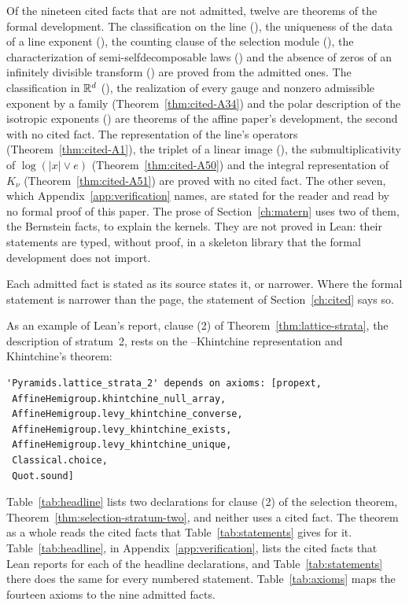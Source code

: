 Of the nineteen cited facts that are not admitted, twelve are theorems of the formal development.
The classification on the line (), the uniqueness of the data of a line exponent
(), the counting clause of the selection module (), the characterization of
semi-selfdecomposable laws () and the absence of zeros of an infinitely divisible
transform () are proved from the admitted ones. The classification in $\mathbb{R}^d$
(), the realization of every gauge and nonzero admissible exponent by a family
(Theorem~\ref{thm:cited-A34}) and the polar description of the isotropic exponents ()
are theorems of
the affine paper's development, the second with no cited fact. The representation of the line's
operators (Theorem~\ref{thm:cited-A1}), the triplet of a linear image (), the
submultiplicativity of $\log(|x| \vee e)$ (Theorem~\ref{thm:cited-A50}) and the integral
representation of $K_\nu$ (Theorem~\ref{thm:cited-A51}) are proved with no cited fact. The other
seven, which
Appendix~\ref{app:verification} names, are stated for the reader and read by no formal proof of
this paper. The prose of Section~\ref{ch:matern} uses two of them, the Bernstein facts, to explain
the kernels. They are not proved in Lean: their statements are typed, without proof, in a skeleton
library that the formal development does not import.

Each admitted fact is stated as its source states it, or narrower. Where the formal statement is
narrower than the page, the statement of Section~\ref{ch:cited} says so.

As an example of Lean's report, clause (2) of Theorem~\ref{thm:lattice-strata}, the description of
stratum~2, rests on the \Levy{}--Khintchine representation and Khintchine's theorem:
\begin{verbatim}
'Pyramids.lattice_strata_2' depends on axioms: [propext,
 AffineHemigroup.khintchine_null_array,
 AffineHemigroup.levy_khintchine_converse,
 AffineHemigroup.levy_khintchine_exists,
 AffineHemigroup.levy_khintchine_unique,
 Classical.choice,
 Quot.sound]
\end{verbatim}
Table~\ref{tab:headline} lists two declarations for clause (2) of the selection theorem,
Theorem~\ref{thm:selection-stratum-two}, and neither uses a cited fact. The theorem as a whole reads
the cited facts that Table~\ref{tab:statements} gives for it. Table~\ref{tab:headline}, in
Appendix~\ref{app:verification}, lists the cited facts that Lean reports for each of the headline
declarations, and Table~\ref{tab:statements} there does the same for every numbered statement.
Table~\ref{tab:axioms} maps the fourteen axioms to the nine admitted facts.
